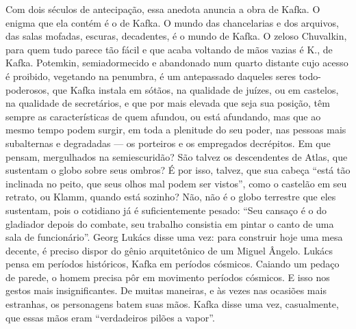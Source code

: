Com dois séculos de antecipação, essa anedota anuncia a obra de Kafka. O
enigma que ela contém é o de Kafka. O mundo das chancelarias e dos
arquivos, das salas mofadas, escuras, decadentes, é o mundo de Kafka. O
zeloso Chuvalkin, para quem tudo parece tão fácil e que acaba voltando
de mãos vazias é K., de Kafka. Potemkin, semiadormecido e abandonado
num quarto distante cujo acesso é proibido, vegetando na penumbra, é um
antepassado daqueles seres todo-poderosos, que Kafka instala em sótãos,
na qualidade de juízes, ou em castelos, na qualidade de secretários, e
que por mais elevada que seja sua posição, têm sempre as características
de quem afundou, ou está afundando, mas que ao mesmo tempo podem surgir,
em toda a plenitude do seu poder, nas pessoas mais subalternas e
degradadas --- os porteiros e os empregados decrépitos. Em que pensam,
mergulhados na semiescuridão? São talvez os descendentes de Atlas, que
sustentam o globo sobre seus ombros? É por isso, talvez, que sua cabeça
``está tão inclinada no peito, que seus olhos mal podem ser vistos'',
como o castelão em seu retrato, ou Klamm, quando está sozinho? Não, não
é o globo terrestre que eles sustentam, pois o cotidiano já é
suficientemente pesado: ``Seu cansaço é o do gladiador depois do
combate, seu trabalho consistia em pintar o canto de uma sala de
funcionário''. Georg Lukács disse uma vez: para construir hoje uma mesa
decente, é preciso dispor do gênio arquitetônico de um Miguel Ângelo.
Lukács pensa em períodos históricos, Kafka em períodos cósmicos. Caiando
um pedaço de parede, o homem precisa pôr em movimento períodos cósmicos.
E isso nos gestos mais insignificantes. De muitas maneiras, e às vezes
nas ocasiões mais estranhas, os personagens batem suas mãos. Kafka disse
uma vez, casualmente, que essas mãos eram ``verdadeiros pilões a
vapor''.

